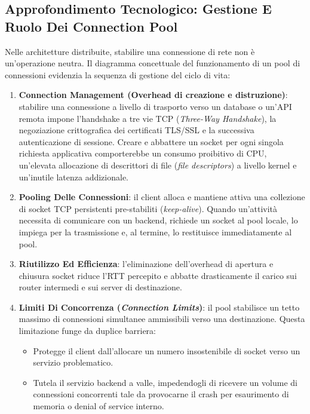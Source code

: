 \documentclass[11pt, a4paper]{article}
\begin{document}
\subsection{Approfondimento Tecnologico: Gestione E Ruolo Dei Connection Pool}

Nelle architetture distribuite, stabilire una connessione di rete non è un'operazione neutra. Il diagramma concettuale del funzionamento di un pool di connessioni evidenzia la sequenza di gestione del ciclo di vita:

\begin{enumerate}
    \item \textbf{Connection Management (Overhead di creazione e distruzione)}: stabilire una connessione a livello di trasporto verso un database o un'API remota impone l'handshake a tre vie TCP (\emph{Three-Way Handshake}), la negoziazione crittografica dei certificati TLS/SSL e la successiva autenticazione di sessione. Creare e abbattere un socket per ogni singola richiesta applicativa comporterebbe un consumo proibitivo di CPU, un'elevata allocazione di descrittori di file (\emph{file descriptors}) a livello kernel e un'inutile latenza addizionale.
    \item \textbf{Pooling Delle Connessioni}: il client alloca e mantiene attiva una collezione di socket TCP persistenti pre-stabiliti (\emph{keep-alive}). Quando un'attività necessita di comunicare con un backend, richiede un socket al pool locale, lo impiega per la trasmissione e, al termine, lo restituisce immediatamente al pool.
    \item \textbf{Riutilizzo Ed Efficienza}: l'eliminazione dell'overhead di apertura e chiusura socket riduce l'RTT percepito e abbatte drasticamente il carico sui router intermedi e sui server di destinazione.
    \item \textbf{Limiti Di Concorrenza (\emph{Connection Limits})}: il pool stabilisce un tetto massimo di connessioni simultanee ammissibili verso una destinazione. Questa limitazione funge da duplice barriera:
    \begin{itemize}[noitemsep]
        \item Protegge il client dall'allocare un numero insostenibile di socket verso un servizio problematico.
        \item Tutela il servizio backend a valle, impedendogli di ricevere un volume di connessioni concorrenti tale da provocarne il crash per esaurimento di memoria o denial of service interno.
    \end{itemize}
\end{enumerate}
\end{document}

